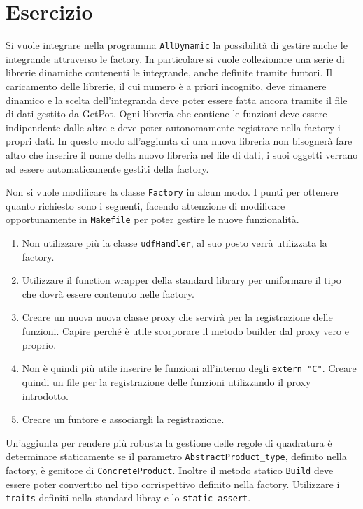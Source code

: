 \section*{Esercizio}

Si vuole integrare nella programma \texttt{AllDynamic} la possibilit\`a di
gestire anche le integrande attraverso le factory. In particolare si vuole
collezionare una serie di librerie dinamiche contenenti le integrande, anche
definite tramite funtori. Il caricamento delle librerie, il cui numero \`e a
priori incognito, deve rimanere dinamico e la scelta dell'integranda deve poter
essere fatta ancora tramite il file di dati gestito da GetPot.
Ogni libreria che contiene le funzioni deve essere indipendente dalle altre e
deve poter autonomamente registrare nella factory i propri dati. In questo modo
all'aggiunta di una nuova libreria non bisogner\`a fare altro che inserire il
nome della nuovo libreria nel file di dati, i suoi oggetti verrano ad essere
automaticamente gestiti della factory.

Non si vuole modificare la classe \texttt{Factory} in alcun modo.
I punti per ottenere quanto richiesto sono i seguenti, facendo attenzione di
modificare opportunamente in \texttt{Makefile} per poter gestire le nuove
funzionalit\`a.

\begin{enumerate}

    \item Non utilizzare pi\`u la classe \texttt{udfHandler}, al suo posto
    verr\`a utilizzata la factory.

    \item Utilizzare il function wrapper della standard library per uniformare
    il tipo che dovr\`a essere contenuto nelle factory.

    \item Creare un nuova nuova classe proxy che servir\`a per la registrazione
    delle funzioni. Capire perch\'e \`e utile scorporare il metodo builder dal proxy
    vero e proprio.

    \item Non \`e quindi pi\`u utile inserire le funzioni all'interno degli
    \texttt{extern "C"}. Creare quindi un file per la registrazione delle
    funzioni utilizzando il proxy introdotto.

    \item Creare un funtore e associargli la registrazione.

\end{enumerate}

Un'aggiunta per rendere pi\`u robusta la gestione delle regole di quadratura \`e
determinare staticamente se il parametro \texttt{AbstractProduct\_type},
definito nella factory, \`e genitore di \texttt{ConcreteProduct}. Inoltre il
metodo statico \texttt{Build} deve essere poter convertito nel tipo
corrispettivo definito nella factory. Utilizzare i \texttt{traits} definiti
nella standard libray e lo \texttt{static\_assert}.
